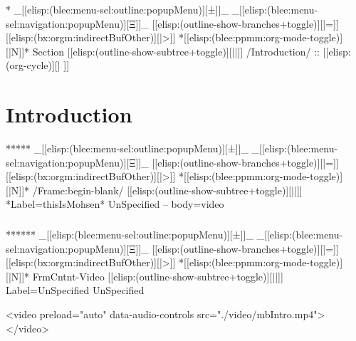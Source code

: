 \begin{whenOrg}
\begin{whenOrg}
*  _[[elisp:(blee:menu-sel:outline:popupMenu)][±]]_ _[[elisp:(blee:menu-sel:navigation:popupMenu)][Ξ]]_ [[elisp:(outline-show-branches+toggle)][|=]] [[elisp:(bx:orgm:indirectBufOther)][|>]] *[[elisp:(blee:ppmm:org-mode-toggle)][|N]]*  Section    [[elisp:(outline-show-subtree+toggle)][||]]   /Introduction/ ::  [[elisp:(org-cycle)][| ]]
\end{whenOrg}

\section{Introduction}


\begin{whenOrg}
*****  _[[elisp:(blee:menu-sel:outline:popupMenu)][±]]_ _[[elisp:(blee:menu-sel:navigation:popupMenu)][Ξ]]_ [[elisp:(outline-show-branches+toggle)][|=]] [[elisp:(bx:orgm:indirectBufOther)][|>]] *[[elisp:(blee:ppmm:org-mode-toggle)][|N]]*  /Frame:begin-blank/ [[elisp:(outline-show-subtree+toggle)][||]] *Label=thisIsMohsen* UnSpecified -- body=video
\end{whenOrg}

\begin{frame}[fragile,plain,label=thisIsMohsen]
    \frametitle{}

\begin{whenOrg}
******  _[[elisp:(blee:menu-sel:outline:popupMenu)][±]]_ _[[elisp:(blee:menu-sel:navigation:popupMenu)][Ξ]]_ [[elisp:(outline-show-branches+toggle)][|=]] [[elisp:(bx:orgm:indirectBufOther)][|>]] *[[elisp:(blee:ppmm:org-mode-toggle)][|N]]*  FrmCntnt-Video [[elisp:(outline-show-subtree+toggle)][||]] Label=UnSpecified UnSpecified
\end{whenOrg}
\begin{presentationMode}
\begin{htmlonly}
  \begin{rawhtml}
<video preload="auto" data-audio-controls src="./video/mbIntro.mp4"></video>
  \end{rawhtml}
\end{htmlonly}
\end{presentationMode}


\end{frame}
\end{whenOrg}
